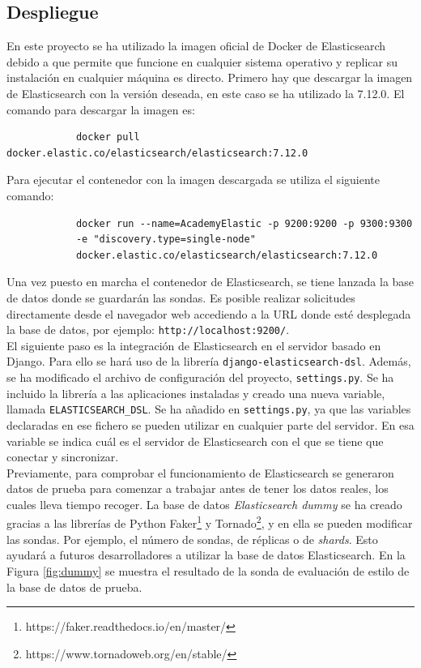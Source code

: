 \subsection{Despliegue}
En este proyecto se ha utilizado la imagen oficial de Docker de Elasticsearch debido a que permite que funcione en cualquier sistema operativo y replicar su instalación en cualquier máquina es directo. Primero hay que descargar la imagen de Elasticsearch con la versión deseada, en este caso se ha utilizado la 7.12.0. El comando para descargar la imagen es:
{\footnotesize
		\begin{verbatim}
			docker pull docker.elastic.co/elasticsearch/elasticsearch:7.12.0
		\end{verbatim}
		}
  \newpage
Para ejecutar el contenedor con la imagen descargada se utiliza el siguiente comando:

{\footnotesize
		\begin{verbatim}
			docker run --name=AcademyElastic -p 9200:9200 -p 9300:9300
            -e "discovery.type=single-node" 
            docker.elastic.co/elasticsearch/elasticsearch:7.12.0
		\end{verbatim}
		}

  Una vez puesto en marcha el contenedor de Elasticsearch, se tiene lanzada la base de datos donde se guardarán las sondas. Es posible realizar solicitudes directamente desde el navegador web accediendo a la URL donde esté desplegada la base de datos, por ejemplo: \texttt{http://localhost:9200/}.\\
  
   El siguiente paso es la integración de Elasticsearch en el servidor basado en Django. Para ello se hará uso de la librería \texttt{django-elasticsearch-dsl}. Además, se ha modificado el archivo de configuración del proyecto, \texttt{settings.py}. Se ha incluido la librería a las aplicaciones instaladas y creado una nueva variable, llamada \texttt{ELASTICSEARCH\_DSL}. Se ha añadido en \texttt{settings.py}, ya que las variables declaradas en ese fichero se pueden utilizar en cualquier parte del servidor. En esa variable se indica cuál es el servidor de Elasticsearch con el que se tiene que conectar y sincronizar.\\

Previamente, para comprobar el funcionamiento de Elasticsearch se generaron datos de prueba para comenzar a trabajar antes de tener los datos reales, los cuales lleva tiempo recoger. La base de datos \textit{Elasticsearch dummy} se ha creado gracias a las librerías de Python Faker\footnote{https://faker.readthedocs.io/en/master/} y Tornado\footnote{https://www.tornadoweb.org/en/stable/}, y en ella se pueden modificar las sondas. Por ejemplo, el número de sondas, de réplicas o de \textit{shards}. Esto ayudará a futuros desarrolladores a utilizar la base de datos Elasticsearch. En la Figura \ref{fig:dummy} se muestra el resultado de la sonda de evaluación de estilo de la base de datos de prueba.


